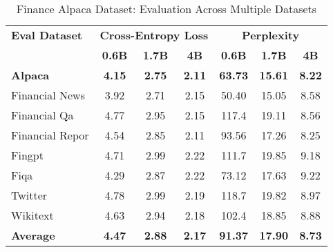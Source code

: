 
\begin{table}[h]
\centering
\caption[Finance Alpaca: Evaluation Results]{Finance Alpaca Dataset: Evaluation Across Multiple Datasets}
\label{tab:alpaca_results}
\begin{tabular}{l|ccc|ccc}
\hline
\textbf{Eval Dataset} & \multicolumn{3}{c|}{\textbf{Cross-Entropy Loss}} & \multicolumn{3}{c}{\textbf{Perplexity}} \\
\cline{2-4} \cline{5-7}
  & \textbf{0.6B} & \textbf{1.7B} & \textbf{4B} & \textbf{0.6B} & \textbf{1.7B} & \textbf{4B} \\
\textbf{Alpaca} & \textbf{4.15} & \textbf{2.75} & \textbf{2.11} & \textbf{63.73} & \textbf{15.61} & \textbf{8.22} \\
Financial News & 3.92 & 2.71 & 2.15 & 50.40 & 15.05 & 8.58 \\
Financial Qa & 4.77 & 2.95 & 2.15 & 117.4 & 19.11 & 8.56 \\
Financial Repor & 4.54 & 2.85 & 2.11 & 93.56 & 17.26 & 8.25 \\
Fingpt & 4.71 & 2.99 & 2.22 & 111.7 & 19.85 & 9.18 \\
Fiqa & 4.29 & 2.87 & 2.22 & 73.12 & 17.63 & 9.22 \\
Twitter & 4.78 & 2.99 & 2.19 & 118.7 & 19.82 & 8.97 \\
Wikitext & 4.63 & 2.94 & 2.18 & 102.4 & 18.85 & 8.88 \\
\hline
\textbf{Average} & \textbf{4.47} & \textbf{2.88} & \textbf{2.17} & \textbf{91.37} & \textbf{17.90} & \textbf{8.73} \\
\hline
\end{tabular}
\end{table}

